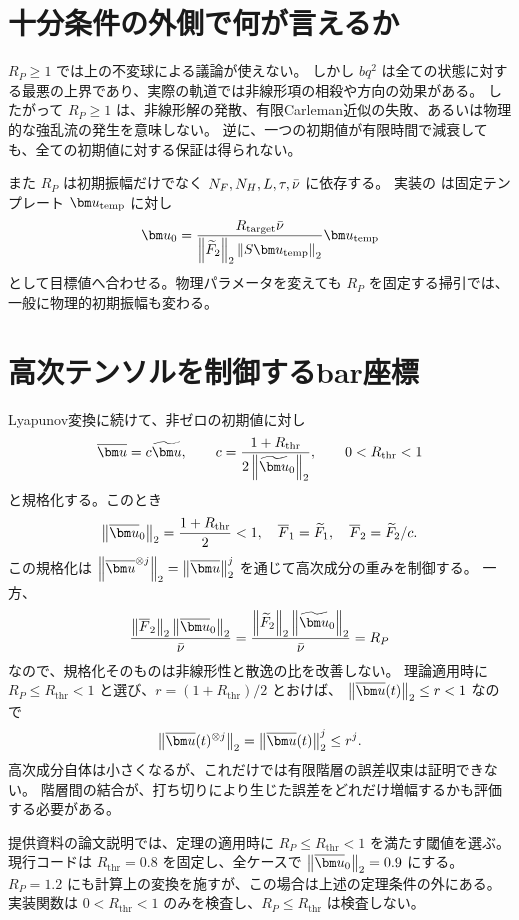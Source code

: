 \section{十分条件の外側で何が言えるか}
$R_P\geq1$ では上の不変球による議論が使えない。
しかし $bq^2$ は全ての状態に対する最悪の上界であり、実際の軌道では非線形項の相殺や方向の効果がある。
したがって $R_P\geq1$ は、非線形解の発散、有限Carleman近似の失敗、あるいは物理的な強乱流の発生を意味しない。
逆に、一つの初期値が有限時間で減衰しても、全ての初期値に対する保証は得られない。

また $R_P$ は初期振幅だけでなく $N_F,N_H,L,\tau,\bar\nu$ に依存する。
実装の  は固定テンプレート $\uu_{\mathrm{temp}}$ に対し
\[
\uu_0=\frac{R_{\mathrm{target}}\nuu}
{\normtwo{\widetilde F_2}\normtwo{S\uu_{\mathrm{temp}}}}\uu_{\mathrm{temp}}
\]
として目標値へ合わせる。物理パラメータを変えても $R_P$ を固定する掃引では、一般に物理的初期振幅も変わる。

\section{高次テンソルを制御するbar座標}
Lyapunov変換に続けて、非ゼロの初期値に対し
\begin{equation}
\bu=c\tu,\qquad c=\frac{1+R_{\mathrm{thr}}}{2\normtwo{\tu_0}},
\qquad 0<R_{\mathrm{thr}}<1
\label{eq:bar}
\end{equation}
と規格化する。このとき
\begin{equation}
\normtwo{\bu_0}=\frac{1+R_{\mathrm{thr}}}2<1,\quad
\overline F_1=\widetilde F_1,\quad
\overline F_2=\widetilde F_2/c.
\end{equation}
この規格化は $\normtwo{\bu^{\otimes j}}=\normtwo{\bu}^j$ を通じて高次成分の重みを制御する。
一方、
\[
\frac{\normtwo{\overline F_2}\normtwo{\bu_0}}{\nuu}
=\frac{\normtwo{\widetilde F_2}\normtwo{\tu_0}}{\nuu}=R_P
\]
なので、規格化そのものは非線形性と散逸の比を改善しない。
理論適用時に $R_P\leq R_{\mathrm{thr}}<1$ と選び、$r=(1+R_{\mathrm{thr}})/2$ とおけば、
$\normtwo{\bu(t)}\leq r<1$ なので
\[
\normtwo{\bu(t)^{\otimes j}}=\normtwo{\bu(t)}^j\leq r^j.
\]
高次成分自体は小さくなるが、これだけでは有限階層の誤差収束は証明できない。
階層間の結合が、打ち切りにより生じた誤差をどれだけ増幅するかも評価する必要がある。


提供資料の論文説明では、定理の適用時に $R_P\leq R_{\mathrm{thr}}<1$ を満たす閾値を選ぶ。
現行コードは $R_{\mathrm{thr}}=0.8$ を固定し、全ケースで $\normtwo{\bu_0}=0.9$ にする。
$R_P=1.2$ にも計算上の変換を施すが、この場合は上述の定理条件の外にある。
実装関数は $0<R_{\mathrm{thr}}<1$ のみを検査し、$R_P\leq R_{\mathrm{thr}}$ は検査しない。

